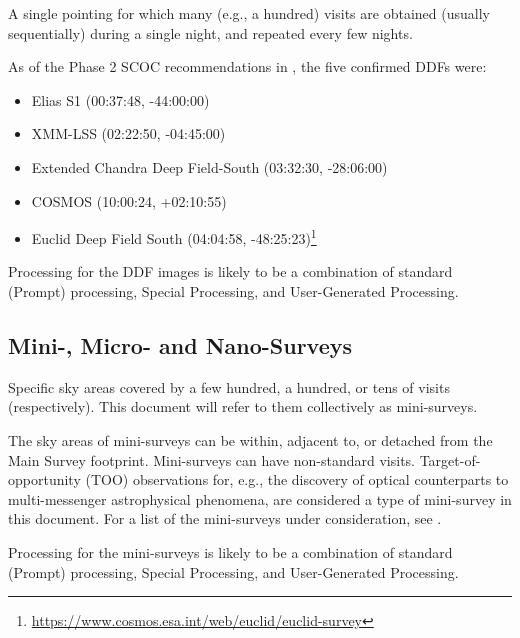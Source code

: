 A single pointing for which many (e.g., a hundred) visits are obtained 
(usually sequentially) during a single night, and repeated every few 
nights.

As of the Phase 2 SCOC recommendations in , the five 
confirmed DDFs were:

\begin{itemize}
\item Elias S1 (00:37:48, -44:00:00)
\item XMM-LSS (02:22:50, -04:45:00)
\item Extended Chandra Deep Field-South (03:32:30, -28:06:00)
\item COSMOS (10:00:24, +02:10:55)
\item Euclid Deep Field South  (04:04:58, -48:25:23)\footnote{\url{https://www.cosmos.esa.int/web/euclid/euclid-survey}}
\end{itemize}

Processing for the DDF images is likely to be a combination of standard (Prompt) processing,
Special Processing, and User-Generated Processing.

\subsection{Mini-, Micro- and Nano-Surveys}

Specific sky areas covered by a few hundred, a hundred, or tens of visits (respectively).
This document will refer to them collectively as mini-surveys.

The sky areas of mini-surveys can be within, adjacent to, or detached from the Main Survey footprint.
Mini-surveys can have non-standard visits.
Target-of-opportunity (TOO) observations for, e.g., the discovery of optical counterparts to 
multi-messenger astrophysical phenomena, are considered a type of mini-survey in this document.
For a list of the mini-surveys under consideration,
see .

Processing for the mini-surveys is likely to be a combination of standard (Prompt) processing,
Special Processing, and User-Generated Processing.
